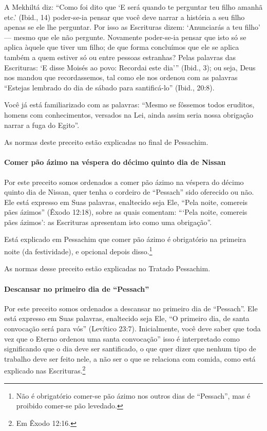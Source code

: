 A Mekhiltá diz: ``Como foi dito que `E será quando te perguntar teu
filho amanhã etc.' (Ibid., 14) poder-se-ia pensar que você deve narrar a
história a seu filho apenas se ele lhe perguntar. Por isso as Escrituras
dizem: `Anunciarás a teu filho' --- mesmo que ele não pergunte.
Novamente poder-se-ia pensar que isto só se aplica àquele que tiver um
filho; de que forma concluímos que ele se aplica também a quem estiver
só ou entre pessoas estranhas? Pelas palavras das Escrituras: `E disse
Moisés ao povo: Recordai este dia''' (Ibid., 3); ou seja, Deus nos
mandou que recordassemos, tal como ele nos ordenou com as palavras
``Estejas lembrado do dia de sábado para santificá-lo'' (Ibid., 20:8).

Você já está familiarizado com as palavras: ``Mesmo se fôssemos todos
eruditos, homens com conhecimentos, versados na Lei, ainda assim seria
nossa obrigação narrar a fuga do Egito''.

As normas deste preceito estão explicadas no final de Pessachim.

\paragraph{Comer pão ázimo na véspera do décimo quinto dia de Nissan}

Por este preceito somos ordenados a comer pão ázimo na véspera do décimo
quinto dia de Nissan, quer tenha o cordeiro de ``Pessach'' sido oferecido ou não. Ele está expresso em Suas palavras, enaltecido seja Ele,
``Pela noite, comereis pães ázimos'' (Êxodo 12:18), sobre as quais
comentam: ```Pela noite, comereis pães ázimos': as Escrituras apresentam
isto como uma obrigação''.

Está explicado em Pessachim que comer pão ázimo é obrigatório na primeira
noite (da festividade), e opcional depois disso.\footnote{Não é obrigatório comer-se pão ázimo nos outros dias de ``Pessach'', mas é proibido comer-se pão levedado.}

As normas desse preceito estão explicadas no Tratado Pessachim.

\paragraph{Descansar no primeiro dia de ``Pessach''}

Por este preceito somos ordenados a descansar no primeiro dia de
``Pessach''. Ele está expresso em Suas palavras, enaltecido seja Ele, ``O
primeiro dia, de santa convocação será para vós'' (Levítico 23:7).
Inicialmente, você deve saber que toda vez que o Eterno ordenou uma
santa convocação'' isso é interpretado como significando que o dia deve ser santificado, o que quer dizer que nenhum tipo de trabalho deve ser feito nele, a não ser o que se relaciona com comida, como está explicado nas Escrituras.\footnote{Em Êxodo 12:16.}

